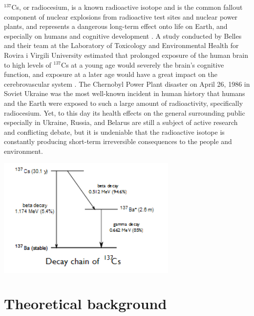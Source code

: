 \documentclass[10pt,letterpaper,onecolumn]{article}
\begin{document}
$^{137}$Cs, or radiocesium, is a known radioactive isotope and is the common fallout component of nuclear explosions from radioactive test sites and nuclear power plants, and represents a dangerous long-term effect onto life on Earth, and especially on humans and cognitive development \cite{belles}. A study conducted by Belles and their team at the Laboratory of Toxicology and Environmental Health for Rovira i Virgili University estimated that prolonged exposure of the human brain to high levels of $^{137}$Cs at a young age would severely the brain's cognitive function, and exposure at a later age would have a great impact on the cerebrovascular system \cite{belles}. The Chernobyl Power Plant disaster on April 26, 1986 in Soviet Ukraine was the most well-known incident in human history that humans and the Earth were exposed to such a large amount of radioactivity, specifically radiocesium. Yet, to this day its health effects on the general surrounding public especially in Ukraine, Russia, and Belarus are still a subject of active research and conflicting debate, but it is undeniable that the radioactive isotope is constantly producing short-term irreversible consequences to the people and environment.




 \begin{center}
 \includegraphics*[width=3.5in]{HalfLife_LevelDiagram.png}
 \label{fig:cshalflife}
 \end{center}



\section{Theoretical background}
\end{document}
